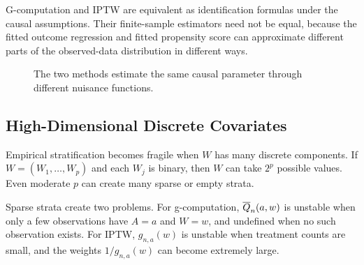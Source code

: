 \begin{keyidea}
G-computation and IPTW are equivalent as identification formulas under the causal
assumptions. Their finite-sample estimators need not be equal, because the fitted
outcome regression and fitted propensity score can approximate different parts of the
observed-data distribution in different ways.
\end{keyidea}

\begin{figure}[H]
\centering
{}
\caption{The two methods estimate the same causal parameter through different nuisance functions.}
\label{fig:ch4-gcomp-iptw-comparison}
\end{figure}

\subsection{High-Dimensional Discrete Covariates}

Empirical stratification becomes fragile when $W$ has many discrete components.
If $W=(W_1,\ldots,W_p)$ and each $W_j$ is binary, then $W$ can take $2^p$ possible
values. Even moderate $p$ can create many sparse or empty strata.

Sparse strata create two problems. For g-computation, $\overline{Q}_n(a,w)$ is unstable when
only a few observations have $A=a$ and $W=w$, and undefined when no such observation
exists. For IPTW, $g_{n,a}(w)$ is unstable when treatment counts are small, and the
weights $1/g_{n,a}(w)$ can become extremely large.

